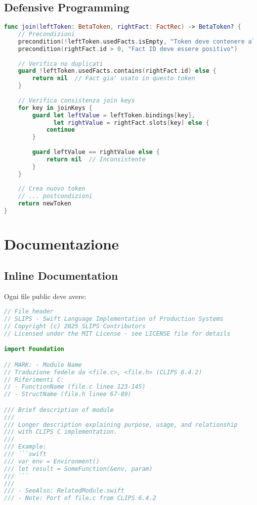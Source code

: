 \subsection{Defensive Programming}

\begin{lstlisting}[language=Swift]
func join(leftToken: BetaToken, rightFact: FactRec) -> BetaToken? {
    // Precondizioni
    precondition(!leftToken.usedFacts.isEmpty, "Token deve contenere almeno 1 fatto")
    precondition(rightFact.id > 0, "Fact ID deve essere positivo")
    
    // Verifica no duplicati
    guard !leftToken.usedFacts.contains(rightFact.id) else {
        return nil  // Fact gia' usato in questo token
    }
    
    // Verifica consistenza join keys
    for key in joinKeys {
        guard let leftValue = leftToken.bindings[key],
              let rightValue = rightFact.slots[key] else {
            continue
        }
        
        guard leftValue == rightValue else {
            return nil  // Inconsistente
        }
    }
    
    // Crea nuovo token
    // ... postcondizioni
    return newToken
}
\end{lstlisting}

\section{Documentazione}

\subsection{Inline Documentation}

Ogni file public deve avere:

\begin{lstlisting}[language=Swift]
// File header
// SLIPS - Swift Language Implementation of Production Systems
// Copyright (c) 2025 SLIPS Contributors
// Licensed under the MIT License - see LICENSE file for details

import Foundation

// MARK: - Module Name
// Traduzione fedele da <file.c>, <file.h> (CLIPS 6.4.2)
// Riferimenti C:
// - FunctionName (file.c linee 123-145)
// - StructName (file.h linee 67-89)

/// Brief description of module
///
/// Longer description explaining purpose, usage, and relationship
/// with CLIPS C implementation.
///
/// Example:
/// ```swift
/// var env = Environment()
/// let result = SomeFunction(&env, param)
/// ```
///
/// - SeeAlso: RelatedModule.swift
/// - Note: Port of file.c from CLIPS 6.4.2
\end{lstlisting}

